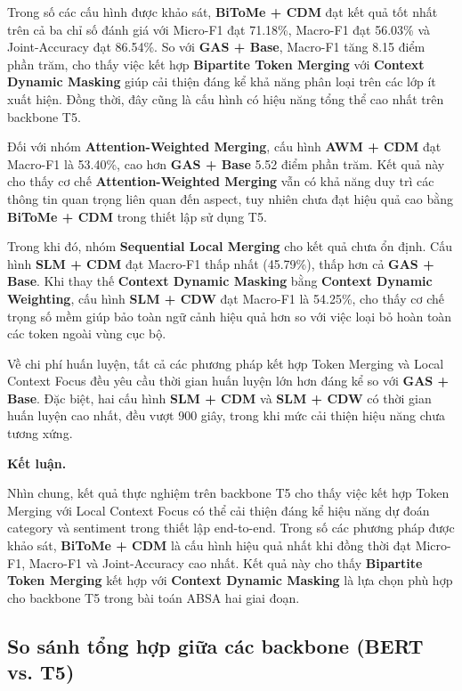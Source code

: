 Trong số các cấu hình được khảo sát, \textbf{BiToMe + CDM} đạt kết quả tốt nhất trên cả ba chỉ số đánh giá với Micro-F1 đạt 71.18\%, Macro-F1 đạt 56.03\% và Joint-Accuracy đạt 86.54\%. So với \textbf{GAS + Base}, Macro-F1 tăng 8.15 điểm phần trăm, cho thấy việc kết hợp \textbf{Bipartite Token Merging} với \textbf{Context Dynamic Masking} giúp cải thiện đáng kể khả năng phân loại trên các lớp ít xuất hiện. Đồng thời, đây cũng là cấu hình có hiệu năng tổng thể cao nhất trên backbone T5.

Đối với nhóm \textbf{Attention-Weighted Merging}, cấu hình \textbf{AWM + CDM} đạt Macro-F1 là 53.40\%, cao hơn \textbf{GAS + Base} 5.52 điểm phần trăm. Kết quả này cho thấy cơ chế \textbf{Attention-Weighted Merging} vẫn có khả năng duy trì các thông tin quan trọng liên quan đến aspect, tuy nhiên chưa đạt hiệu quả cao bằng \textbf{BiToMe + CDM} trong thiết lập sử dụng T5.

Trong khi đó, nhóm \textbf{Sequential Local Merging} cho kết quả chưa ổn định. Cấu hình \textbf{SLM + CDM} đạt Macro-F1 thấp nhất (45.79\%), thấp hơn cả \textbf{GAS + Base}. Khi thay thế \textbf{Context Dynamic Masking} bằng \textbf{Context Dynamic Weighting}, cấu hình \textbf{SLM + CDW} đạt Macro-F1 là 54.25\%, cho thấy cơ chế trọng số mềm giúp bảo toàn ngữ cảnh hiệu quả hơn so với việc loại bỏ hoàn toàn các token ngoài vùng cục bộ.

Về chi phí huấn luyện, tất cả các phương pháp kết hợp Token Merging và Local Context Focus đều yêu cầu thời gian huấn luyện lớn hơn đáng kể so với \textbf{GAS + Base}. Đặc biệt, hai cấu hình \textbf{SLM + CDM} và \textbf{SLM + CDW} có thời gian huấn luyện cao nhất, đều vượt 900 giây, trong khi mức cải thiện hiệu năng chưa tương xứng.

\textbf{Kết luận.}

Nhìn chung, kết quả thực nghiệm trên backbone T5 cho thấy việc kết hợp Token Merging với Local Context Focus có thể cải thiện đáng kể hiệu năng dự đoán category và sentiment trong thiết lập end-to-end. Trong số các phương pháp được khảo sát, \textbf{BiToMe + CDM} là cấu hình hiệu quả nhất khi đồng thời đạt Micro-F1, Macro-F1 và Joint-Accuracy cao nhất. Kết quả này cho thấy \textbf{Bipartite Token Merging} kết hợp với \textbf{Context Dynamic Masking} là lựa chọn phù hợp cho backbone T5 trong bài toán ABSA hai giai đoạn.

\subsection*{So sánh tổng hợp giữa các backbone (BERT vs. T5)}


